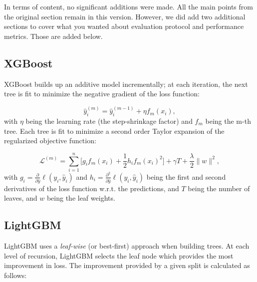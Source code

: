 In terms of content, no significant additions were made. All the main points from the original section remain in this version. However, we did add two additional sections to cover what you wanted about evaluation protocol and performance metrics. Those are added below.

\subsection{XGBoost}

XGBoost builds up an additive model incrementally; at each iteration, the next tree is fit to minimize the negative gradient of the loss function:

\begin{equation}
\hat{y}_i^{(m)}=\hat{y}_i^{(m-1)}+\eta f_m(x_i),
\label{eq:xgb_update}
\end{equation}
with $\eta$ being the learning rate (the step-shrinkage factor) and $f_m$ being the m-th tree. Each tree is fit to minimize a second order Taylor expansion of the regularized objective function:

\begin{equation}
\mathcal{L}^{(m)}=\sum_{i=1}^{n}\big[g_if_m(x_i)+\frac12 h_if_m(x_i)^2\big]+\gamma T+\frac{\lambda}{2}\|w\|^2,
\label{eq:xgb_obj}
\end{equation}
with $g_i=\frac{\partial}{\partial\hat y}\ell(y_i,\hat y_i)$ and $h_i=\frac{\partial^2}{\partial\hat y}\ell(y_i,\hat y_i)$ being the first and second derivatives of the loss function w.r.t. the predictions, and $T$ being the number of leaves, and $w$ being the leaf weights.

\subsection{LightGBM}

LightGBM uses a \emph{leaf-wise} (or best-first) approach when building trees. At each level of recursion, LightGBM selects the leaf node which provides the most improvement in loss. The improvement provided by a given split is calculated as follows:

